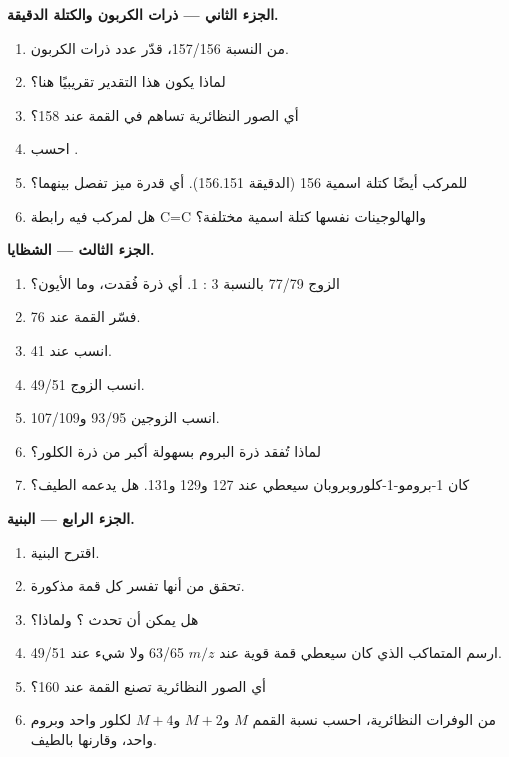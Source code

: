 \begin{problem}
\medskip
\noindent\textbf{الجزء الثاني --- ذرات الكربون والكتلة الدقيقة.}
\begin{enumerate}[resume]
  \item من النسبة 157/156، قدّر عدد ذرات الكربون.
  \item لماذا يكون هذا التقدير تقريبيًا هنا؟
  \item أي الصور النظائرية تساهم في القمة عند 158؟
  \item احسب  .
  \item للمركب  أيضًا كتلة اسمية 156 (الدقيقة 156.151). أي قدرة ميز تفصل
        بينهما؟
  \item هل  لمركب فيه رابطة C=C والهالوجينات نفسها كتلة
        اسمية مختلفة؟
\end{enumerate}

\medskip
\noindent\textbf{الجزء الثالث --- الشظايا.}
\begin{enumerate}[resume]
  \item الزوج 77/79 بالنسبة 3 : 1. أي ذرة فُقدت، وما الأيون؟
  \item فسّر القمة عند 76.
  \item انسب  عند 41.
  \item انسب الزوج 49/51.
  \item انسب الزوجين 93/95 و107/109.
  \item لماذا تُفقد ذرة البروم بسهولة أكبر من ذرة الكلور؟
  \item كان 1-برومو-1-كلوروبروبان سيعطي  عند 127 و129 و131. هل يدعمه
        الطيف؟
\end{enumerate}

\medskip
\noindent\textbf{الجزء الرابع --- البنية.}
\begin{enumerate}[resume]
  \item اقترح البنية.
  \item تحقق من أنها تفسر كل قمة مذكورة.
  \item هل يمكن أن تحدث ؟ ولماذا؟
  \item ارسم المتماكب الذي كان سيعطي قمة قوية عند $m/z$ 63/65 ولا شيء عند 49/51.
  \item أي الصور النظائرية تصنع القمة عند 160؟
  \item من الوفرات النظائرية، احسب نسبة القمم $M$ و$M+2$ و$M+4$ لكلور
        واحد وبروم واحد، وقارنها بالطيف.
\end{enumerate}
\end{problem}
